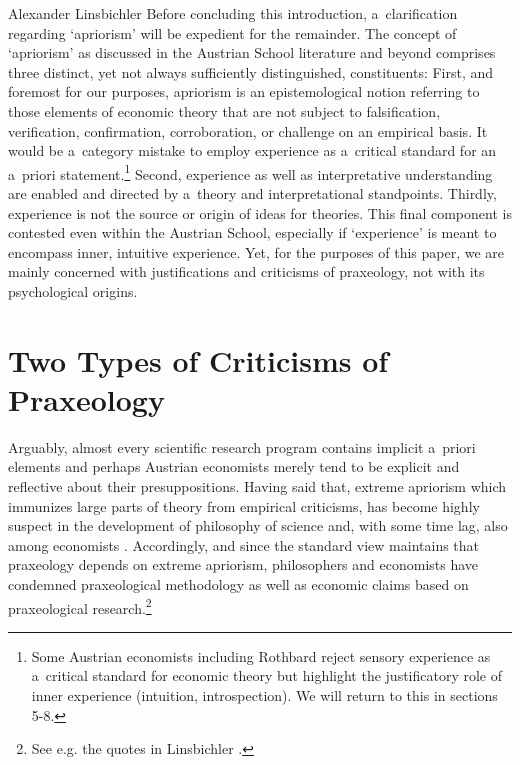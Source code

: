 \begin{artengenv}{Alexander Linsbichler}
Before concluding this introduction, a~clarification regarding ‘apriorism' will be expedient for the remainder. The concept of ‘apriorism' as discussed in the Austrian School literature and beyond comprises three distinct, yet not always sufficiently distinguished, constituents: First, and foremost for our purposes, apriorism is an epistemological notion referring to those elements of economic theory that are not subject to falsification, verification, confirmation, corroboration, or challenge on an empirical basis. It would be a~category mistake to employ experience as a~critical standard for an a~priori statement.\footnote{Some Austrian economists including Rothbard reject sensory experience as a~critical standard for economic theory but highlight the justificatory role of inner experience (intuition, introspection). We will return to this in sections 5-8.} Second, experience as well as interpretative understanding are enabled and directed by a~theory and interpretational standpoints. Thirdly, experience is not the source or origin of ideas for theories. This final component is contested even within the Austrian School, especially if ‘experience' is meant to encompass inner, intuitive experience. Yet, for the purposes of this paper, we are mainly concerned with justifications and criticisms of praxeology, not with its psychological origins.



\section{Two Types of Criticisms of Praxeology}

Arguably, almost every scientific research program contains implicit a~priori elements and perhaps Austrian economists merely tend to be explicit and reflective about their presuppositions. Having said that, extreme apriorism which immunizes large parts of theory from empirical criticisms, has become highly suspect in the development of philosophy of science and, with some time lag, also among economists 
\parencite[][]{scheall_rise_2023}. %
 Accordingly, and since the standard view maintains that praxeology depends on extreme apriorism, philosophers and economists have condemned praxeological methodology as well as economic claims based on praxeological research.\footnote{See e.g. the quotes in Linsbichler 
\parencite*[][p.3360]{linsbichler_austrian_2021}.%
}




\end{artengenv}
